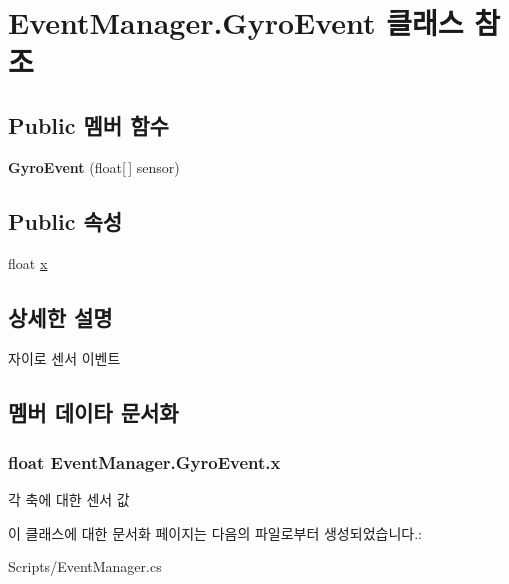 \hypertarget{class_event_manager_1_1_gyro_event}{}\section{Event\+Manager.\+Gyro\+Event 클래스 참조}
\label{class_event_manager_1_1_gyro_event}
\subsection*{Public 멤버 함수}
\begin{DoxyCompactItemize}
\item 
\hypertarget{class_event_manager_1_1_gyro_event_af0a8874c2f307f27846cf7a11d2dae1e}{}{\bfseries Gyro\+Event} (float\mbox{[}$\,$\mbox{]} sensor)\label{class_event_manager_1_1_gyro_event_af0a8874c2f307f27846cf7a11d2dae1e}

\end{DoxyCompactItemize}
\subsection*{Public 속성}
\begin{DoxyCompactItemize}
\item 
float \hyperlink{class_event_manager_1_1_gyro_event_aac433f18595b0ef2df86f6fadb79c8bc}{x}
\end{DoxyCompactItemize}


\subsection{상세한 설명}
자이로 센서 이벤트 

\subsection{멤버 데이타 문서화}
\hypertarget{class_event_manager_1_1_gyro_event_aac433f18595b0ef2df86f6fadb79c8bc}{}
\subsubsection[{x}]{\setlength{\rightskip}{0pt plus 5cm}float Event\+Manager.\+Gyro\+Event.\+x}\label{class_event_manager_1_1_gyro_event_aac433f18595b0ef2df86f6fadb79c8bc}
각 축에 대한 센서 값 

이 클래스에 대한 문서화 페이지는 다음의 파일로부터 생성되었습니다.\+:\begin{DoxyCompactItemize}
\item 
Scripts/Event\+Manager.\+cs\end{DoxyCompactItemize}
